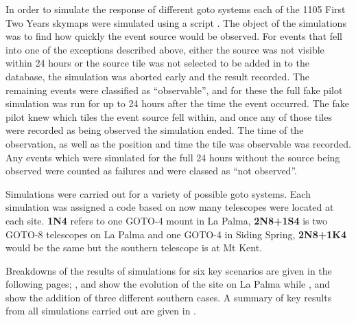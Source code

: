 \begin{colsection}
\begin{colsection}
In order to simulate the response of different \gls{goto} systems each of the 1105 First Two Years skymaps were simulated using a script . The object of the simulations was to find how quickly the event source would be observed. For events that fell into one of the exceptions described above, either the source was not visible within 24 hours or the source tile was not selected to be added in to the database, the simulation was aborted early and the result recorded. The remaining events were classified as ``observable'', and for these the full fake pilot simulation was run for up to 24 hours after the time the event occurred. The fake pilot knew which tiles the event source fell within, and once any of those tiles were recorded as being observed the simulation ended. The time of the observation, as well as the position and time the tile was observable was recorded. Any events which were simulated for the full 24 hours without the source being observed were counted as failures and were classed as ``not observed''.

Simulations were carried out for a variety of possible \gls{goto} systems. Each simulation was assigned a code based on now many telescopes were located at each site. \textbf{1N4} refers to one GOTO-4 mount in La Palma, \textbf{2N8+1S4} is two GOTO-8 telescopes on La Palma and one GOTO-4 in Siding Spring, \textbf{2N8+1K4} would be the same but the southern telescope is at Mt Kent.

Breakdowns of the results of simulations for six key scenarios are given in the following pages; ,  and  show the evolution of the site on La Palma while ,  and  show the addition of three different southern cases. A summary of key results from all simulations carried out are given in .

\newpage


\end{colsection}
\end{colsection}

